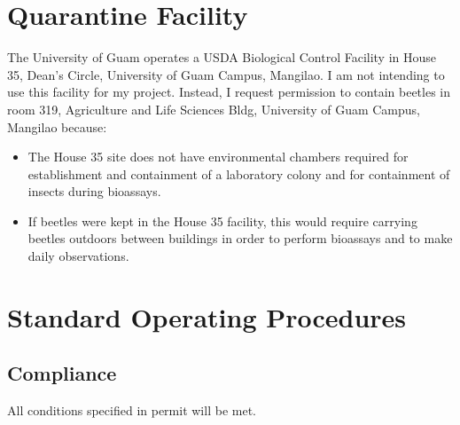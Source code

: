 \documentclass[12pt,english,letterpaper]{scrartcl}
\begin{document}
%
%
%
%
%
%
%
%
%
%
%
%
%

\section{Quarantine Facility}

The University of Guam operates a USDA Biological Control Facility in House 35, Dean's Circle, University of Guam Campus, Mangilao. I am not intending to use this facility for my project. Instead, I request permission to contain beetles in room 319, Agriculture and Life Sciences Bldg, University of Guam Campus, Mangilao because:
\begin{itemize}
	\item The House 35 site does not have environmental chambers required for establishment and containment of a laboratory colony and for containment of insects during bioassays. 
	\item If beetles were kept in the House 35 facility, this would require carrying beetles outdoors between buildings in order to perform bioassays and to make daily observations. 
\end{itemize}

\section{Standard Operating Procedures}

\subsection{Compliance} 
All conditions specified in permit will be met.
	
\end{document}
